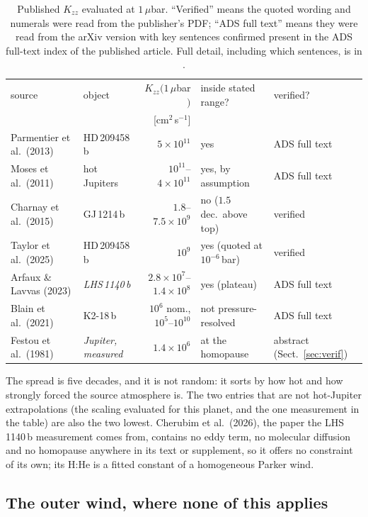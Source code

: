 \documentclass[english,a4paper]{my_memo}
\begin{document}
\begin{table}[htbp]\centering
\caption{Published $K_{zz}$ evaluated at $1\,\mu$bar. ``Verified'' means the
quoted wording and numerals were read from the publisher's PDF;
``ADS full text'' means they were read from the arXiv version with key
sentences confirmed present in the ADS full-text index of the published
article. Full detail, including which sentences, is in
\protect{}.}
\label{tab:lit}
\small
\begin{tabular}{llrll}
\toprule
source & object & $K_{zz}(1\,\mu$bar$)$ & inside stated range? & verified? \\
 & & [cm$^{2}$\,s$^{-1}$] & & \\
\midrule
Parmentier et al.\ (2013) & HD\,209458\,b & $5\times10^{11}$ &
  yes & ADS full text \\
Moses et al.\ (2011) & hot Jupiters & $10^{11}$--$4\times10^{11}$ &
  yes, by assumption & ADS full text \\
Charnay et al.\ (2015) & GJ\,1214\,b & $1.8$--$7.5\times10^{9}$ &
  no ($1.5$ dec.\ above top) & verified \\
Taylor et al.\ (2025) & HD\,209458\,b & $10^{9}$ &
  yes (quoted at $10^{-6}$\,bar) & verified \\
Arfaux \& Lavvas (2023) & \emph{LHS\,1140\,b} & $2.8\times10^{7}$--$1.4\times10^{8}$ &
  yes (plateau) & ADS full text \\
Blain et al.\ (2021) & K2-18\,b & $10^{6}$ nom., $10^{5}$--$10^{10}$ &
  not pressure-resolved & ADS full text \\
\midrule
Festou et al.\ (1981) & \emph{Jupiter, measured} & $1.4\times10^{6}$ &
  at the homopause & abstract (Sect.~\ref{sec:verif}) \\
\bottomrule
\end{tabular}
\end{table}

The spread is five decades, and it is not random: it sorts by how hot and
how strongly forced the source atmosphere is. The two entries that are not
hot-Jupiter extrapolations (the scaling evaluated for this planet, and
the one measurement in the table) are also the two lowest. Cherubim et
al.\ (2026), the paper the LHS\,1140\,b measurement comes from, contains no
eddy term, no molecular diffusion and no homopause anywhere in its text or
supplement, so it offers no constraint of its own; its H:He is a fitted
constant of a homogeneous Parker wind.

\subsection{The outer wind, where none of this applies}
\label{sec:outer}
\end{document}
